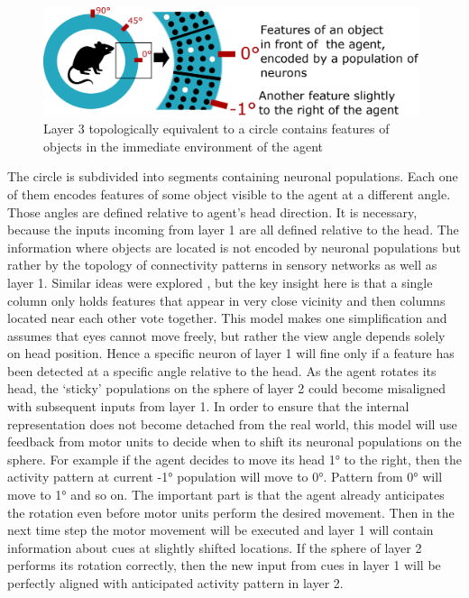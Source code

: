 \documentclass[12pt]{article}
\begin{document}
\begin{figure}[!h]
	\centering
	\includegraphics[width=11cm]{rodent_in_cirle}
	\caption{Layer 3 topologically equivalent to a circle contains features of objects in the immediate environment of the agent}
	\label{fig:rodent_in_circle}
\end{figure}

The circle is subdivided into segments containing neuronal populations. Each one of them encodes features of some object visible to the agent at a different angle. Those angles are defined relative to agent's head direction. It is necessary, because the inputs incoming from layer 1 are all  defined relative to the head. The information where objects are located is not encoded by neuronal populations but rather by the topology of connectivity patterns in sensory networks as well as layer 1. Similar ideas were explored  \cite{Locations_in_the_Neocortex}, but the key insight here is that a single column only holds features that appear in very close vicinity and then columns located near each other vote together. This model makes one simplification and assumes that eyes cannot move freely, but rather the view angle depends solely on head position. Hence a specific neuron of layer 1 will fine only if a feature has been detected at a specific angle relative to the head. As the agent rotates its head, the `sticky' populations on the sphere of layer 2 could become misaligned with subsequent inputs from layer 1. In order to ensure that the internal representation does not become detached from the real world, this model will use feedback from motor units to decide when to shift its neuronal populations on the sphere. For example if the agent decides to move its head 1° to the right, then the activity pattern at current -1° population will move to  0°. Pattern from  0° will move to  1° and so on. The important part is that the agent already anticipates the rotation even before motor units perform the desired movement. Then in the next time step the motor movement will be executed and layer 1 will contain information about cues at slightly shifted locations. If the sphere of layer 2 performs its rotation correctly, then the new input from cues in layer 1 will be perfectly aligned with anticipated activity pattern in layer 2. 
\end{document}
